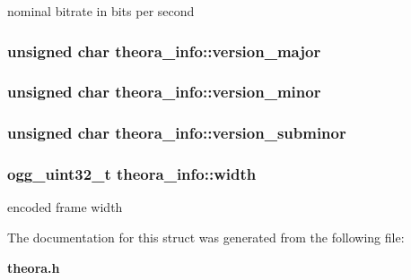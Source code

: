 nominal bitrate in bits per second 

\subsubsection[{version\_\-major}]{\setlength{\rightskip}{0pt plus 5cm}unsigned char {\bf theora\_\-info::version\_\-major}}\label{structtheora__info_a7c5ebb9e6700aaef87f29f7c6074e474}
\subsubsection[{version\_\-minor}]{\setlength{\rightskip}{0pt plus 5cm}unsigned char {\bf theora\_\-info::version\_\-minor}}\label{structtheora__info_a75eda4f30270d833c7b9dba43932a06a}
\subsubsection[{version\_\-subminor}]{\setlength{\rightskip}{0pt plus 5cm}unsigned char {\bf theora\_\-info::version\_\-subminor}}\label{structtheora__info_aa07967ecd6e20bd2928ead42b6397b3d}
\subsubsection[{width}]{\setlength{\rightskip}{0pt plus 5cm}ogg\_\-uint32\_\-t {\bf theora\_\-info::width}}\label{structtheora__info_a17c2fc651bb3329f1ea6b13ff1d3957b}


encoded frame width 



The documentation for this struct was generated from the following file:\begin{DoxyCompactItemize}
\item 
{\bf theora.h}\end{DoxyCompactItemize}
